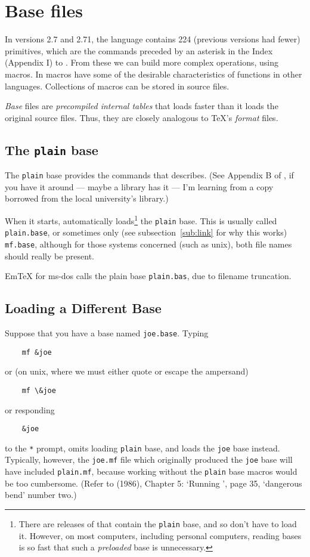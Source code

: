 \section{Base files}\label{sec:base}

In versions 2.7 and 2.71, the \MF{} language contains 224
(previous versions had fewer) primitives,
which are the commands preceded by an asterisk in the Index (Appendix I)
to \MFbook{}.  From these we can build more complex operations,
using macros.  In \MF{} macros have some of the desirable
characteristics of functions in other languages.  Collections of
macros can be stored in \MF{} source files.

{\em Base\/} files are {\em precompiled internal tables\/} that \MF{}
loads faster than it loads the original \MF{} source files.
Thus, they are closely analogous to \TeX{}'s {\em format\/} files.


\subsection{The {\tt plain} base}\label{sub:plain}

The {\tt plain} base provides the commands that \MFbook{}
describes.  (See Appendix B of \MFbook{}, if you have it around
--- maybe a library has it --- I'm learning from a copy borrowed from the
local university's library.)

When it starts, \MF{} automatically loads\footnote
{There are releases of \MF{} that contain the {\tt plain} base,
and so don't have to load it.  However, on most computers, including
personal computers, reading bases is so fast that such a {\em preloaded\/}
base is unnecessary.}
the {\tt plain} base.
This is usually called {\tt plain.base}, or sometimes only (see
subsection~\ref{sub:link} for why this works) {\tt mf.base},
although for those systems concerned (such as {\sc unix}),
both file names should really be present.

Em\TeX{} for {\sc ms-dos} calls the plain base {\tt plain.bas},
due to filename truncation.


\subsection{Loading a Different Base}\label{sub:loading}

Suppose that you have a base named {\tt joe.base}.
Typing
\begin{verbatim}
    mf &joe
\end{verbatim}
or (on unix, where we must either quote or escape the ampersand)
\begin{verbatim}
    mf \&joe
\end{verbatim}
or responding
\begin{verbatim}
    &joe
\end{verbatim}
to the {\tt **} prompt,
omits loading {\tt plain} base, and loads the {\tt joe} base instead.
Typically, however, the {\tt joe.mf} file which originally produced
the {\tt joe} base will have included {\tt plain.mf}, because working
without the {\tt plain} base macros would be too cumbersome.
(Refer to \MFbook{} (1986), Chapter 5: `Running \MF{}', page 35,
`dangerous bend' number two.)

